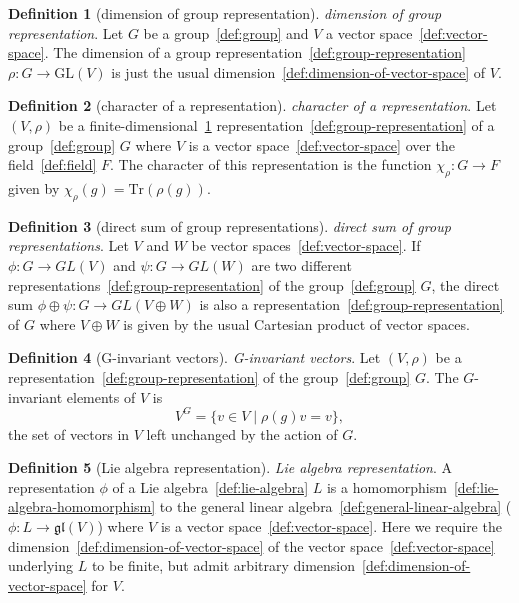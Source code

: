 \documentclass[12pt,a4paper]{article}
\theoremstyle{definition}
\newtheorem{definition}{Definition}
\begin{document}
\begin{definition}[dimension of group representation]\label{def:dimension-of-group-representation}
\emph{dimension of group representation}. Let $G$ be a group~\ref{def:group} and $V$ a vector space~\ref{def:vector-space}. The dimension of a group representation~\ref{def:group-representation} $\rho:G\to \text{GL}(V)$ is just the usual dimension~\ref{def:dimension-of-vector-space} of $V$.
\end{definition}

\begin{definition}[character of a representation]\label{def:character-of-a-representation}
\emph{character of a representation}. Let $(V,\rho)$ be a finite-dimensional~\ref{def:dimension-of-group-representation} representation~\ref{def:group-representation} of a group~\ref{def:group} $G$ where $V$ is a vector space~\ref{def:vector-space} over the field~\ref{def:field} $F$. The character of this representation is the function $\chi_\rho:G\to F$ given by $\chi_\rho(g) = \text{Tr}(\rho(g))$.
\end{definition}

\begin{definition}[direct sum of group representations]\label{def:direct-sum-of-group-representations}
\emph{direct sum of group representations}. Let $V$ and $W$ be vector spaces~\ref{def:vector-space}. If $\phi: G\to GL(V)$ and $\psi:G\to GL(W)$ are two different representations~\ref{def:group-representation} of the group~\ref{def:group} $G$, the direct sum $\phi \oplus \psi:G \to GL(V\oplus W)$ is also a representation~\ref{def:group-representation} of $G$ where $V\oplus W$ is given by the usual Cartesian product of vector spaces.
\end{definition}

\begin{definition}[G-invariant vectors]\label{def:g-invariant-vectors}
\emph{G-invariant vectors}. Let $(V,\rho)$ be a representation~\ref{def:group-representation} of the group~\ref{def:group} $G$. The $G$-invariant elements of $V$ is $$V^G = \{v\in V\mid \rho(g)v=v\},$$ the set of vectors in $V$ left unchanged by the action of $G$.
\end{definition}

\begin{definition}[Lie algebra representation]\label{def:lie-algebra-representation}
\emph{Lie algebra representation}. A representation $\phi$ of a Lie algebra~\ref{def:lie-algebra} $L$ is a homomorphism~\ref{def:lie-algebra-homomorphism} to the general linear algebra~\ref{def:general-linear-algebra} ($\phi:L \to \mathfrak{gl}(V)$) where $V$ is a vector space~\ref{def:vector-space}. Here we require the dimension~\ref{def:dimension-of-vector-space} of the vector space~\ref{def:vector-space} underlying $L$ to be finite, but admit arbitrary dimension~\ref{def:dimension-of-vector-space} for $V$.
\end{definition}
\end{document}
